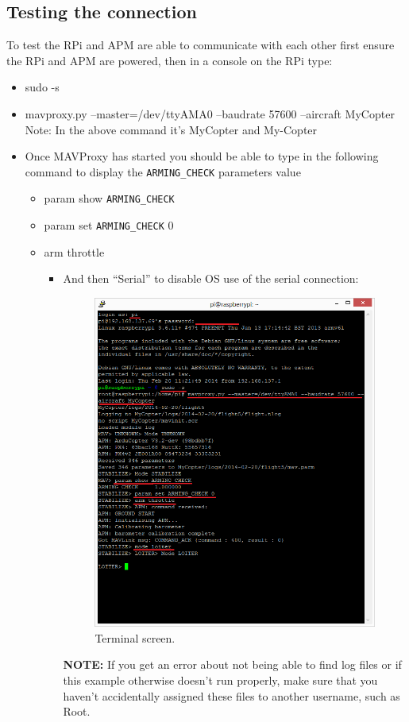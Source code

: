\documentclass[11pt,a4paper]{article}
\begin{document}
			\subsection{Testing the connection}
			To test the RPi and APM are able to communicate with each other first ensure the RPi and APM are powered, then in a console on the RPi type:
			\begin{itemize}
				\item sudo -s
				\item mavproxy.py --master=/dev/ttyAMA0 --baudrate 57600 --aircraft MyCopter
				Note: In the above command it's MyCopter and My-Copter
				\item Once MAVProxy has started you should be able to type in the following command to display the \texttt{ARMING\_CHECK} parameters value
				\begin{itemize}
					\item param show \texttt{ARMING\_CHECK}
					\item param set \texttt{ARMING\_CHECK} 0
					\item arm throttle
					\begin{itemize}
			\item And then “Serial” to disable OS use of the serial connection:
			\begin{figure}[H]
	 	\centering
		\includegraphics[scale=0.6]{connect}
		\caption{Terminal screen.}
\end{figure}
	\textbf{NOTE:} If you get an error about not being able to find log files or if this example otherwise doesn’t run properly, make sure that you haven’t accidentally assigned these files to another username, such as Root.

\end{itemize}
\end{itemize}
\end{itemize}
\end{document}
